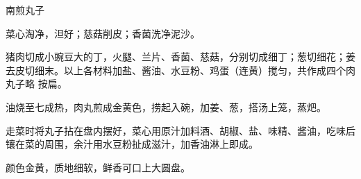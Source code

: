 \begin{recipe}{南煎丸子}

\ingredients


\preparation

\step 菜心淘净，泹好；慈菇削皮；香菌洗净泥沙。

\step 猪肉切成小豌豆大的丁，火腿、兰片、香菌、慈菇，分别切成细丁；葱切细花；姜
去皮切细末。以上各材料加盐、酱油、水豆粉、鸡蛋（连黄）搅匀，共作成四个肉丸子略
按扁。

\step 油烧至七成热，肉丸煎成金黄色，捞起入碗，加姜、葱，搭汤上笼，蒸𤆵。

\step 走菜时将丸子拈在盘内摆好，菜心用原汁加料酒、胡椒、盐、味精、酱油，吃味后
镶在菜的周围，余汁用水豆粉扯成滋汁，加香油淋上即成。

\features

颜色金黄，质地细软，鲜香可口上大圆盘。

\end{recipe}

